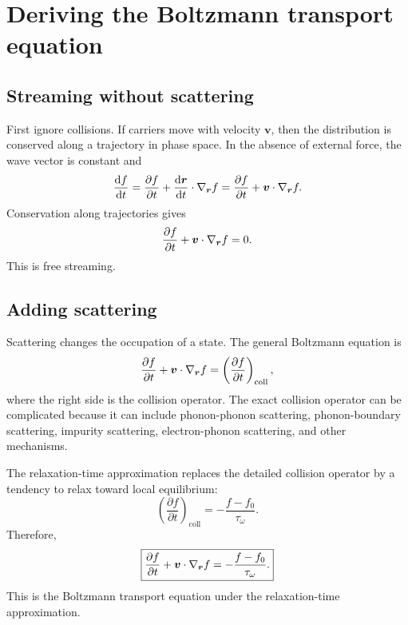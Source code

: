 \documentclass[11pt]{article}
\begin{document}
\section{Deriving the Boltzmann transport equation}
\subsection{Streaming without scattering}
First ignore collisions. If carriers move with velocity \(\bm{v}\), then the distribution is conserved along a trajectory in phase space. In the absence of external force, the wave vector is constant and
\begin{equation}
    \frac{\mathop{}\!\mathrm{d} f}{\mathop{}\!\mathrm{d} t}
    =\frac{\partial f}{\partial t}
    +\frac{\mathop{}\!\mathrm{d} \bm{r}}{\mathop{}\!\mathrm{d} t}\cdot\nabla_{\bm{r}}f
    =\frac{\partial f}{\partial t}+\bm{v}\cdot\nabla_{\bm{r}}f.
\end{equation}
Conservation along trajectories gives
\begin{equation}
    \frac{\partial f}{\partial t}+\bm{v}\cdot\nabla_{\bm{r}}f=0.
\end{equation}
This is free streaming.

\subsection{Adding scattering}
Scattering changes the occupation of a state. The general Boltzmann equation is
\begin{equation}
    \frac{\partial f}{\partial t}+\bm{v}\cdot\nabla_{\bm{r}}f
    =\left(\frac{\partial f}{\partial t}\right)_{\mathrm{coll}},
\end{equation}
where the right side is the collision operator. The exact collision operator can be complicated because it can include phonon-phonon scattering, phonon-boundary scattering, impurity scattering, electron-phonon scattering, and other mechanisms.

The relaxation-time approximation replaces the detailed collision operator by a tendency to relax toward local equilibrium:
\begin{equation}
    \left(\frac{\partial f}{\partial t}\right)_{\mathrm{coll}}
    =-\frac{f-f_0}{\tau_\omega}.
\end{equation}
Therefore,
\begin{equation}
    \boxed{\frac{\partial f}{\partial t}+\bm{v}\cdot\nabla_{\bm{r}}f
    =-\frac{f-f_0}{\tau_\omega}.}
    \label{eq:bte_rta}
\end{equation}
This is the Boltzmann transport equation under the relaxation-time approximation.
\end{document}
